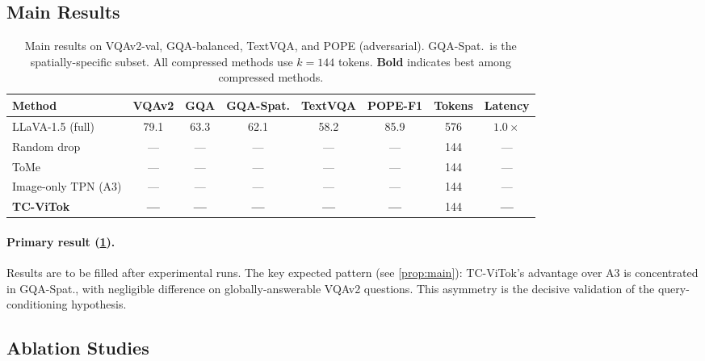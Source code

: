 \documentclass[11pt,a4paper]{article}
\begin{document}
\subsection{Main Results}

\begin{table}[t]
\centering
\caption{Main results on VQAv2-val, GQA-balanced, TextVQA, and POPE (adversarial).
  GQA-Spat.\ is the spatially-specific subset. All compressed methods use
  $k{=}144$ tokens. \textbf{Bold} indicates best among compressed methods.}
\label{tab:main_results}
\renewcommand{\arraystretch}{1.2}
\begin{tabular}{@{}lccccccc@{}}
  \toprule
  Method & VQAv2 & GQA & GQA-Spat. & TextVQA & POPE-F1 & Tokens
    & Latency \\
  \midrule
  LLaVA-1.5 (full)  & 79.1 & 63.3 & 62.1 & 58.2 & 85.9 & 576 & $1.0\times$ \\
  \midrule
  Random drop        & ---  & ---  & ---  & ---  & ---  & 144 & --- \\
  ToMe               & ---  & ---  & ---  & ---  & ---  & 144 & --- \\
  Image-only TPN (A3)& ---  & ---  & ---  & ---  & ---  & 144 & --- \\
  \textbf{TC-ViTok}  & \textbf{---} & \textbf{---} & \textbf{---}
    & \textbf{---} & \textbf{---} & 144 & \textbf{---} \\
  \bottomrule
\end{tabular}
\end{table}

\paragraph{Primary result (\cref{tab:main_results}).}
Results are to be filled after experimental runs. The key expected pattern
(see \cref{prop:main}): TC-ViTok's advantage over A3 is concentrated in
GQA-Spat., with negligible difference on globally-answerable VQAv2 questions.
This asymmetry is the decisive validation of the query-conditioning hypothesis.

\subsection{Ablation Studies}
\end{document}
